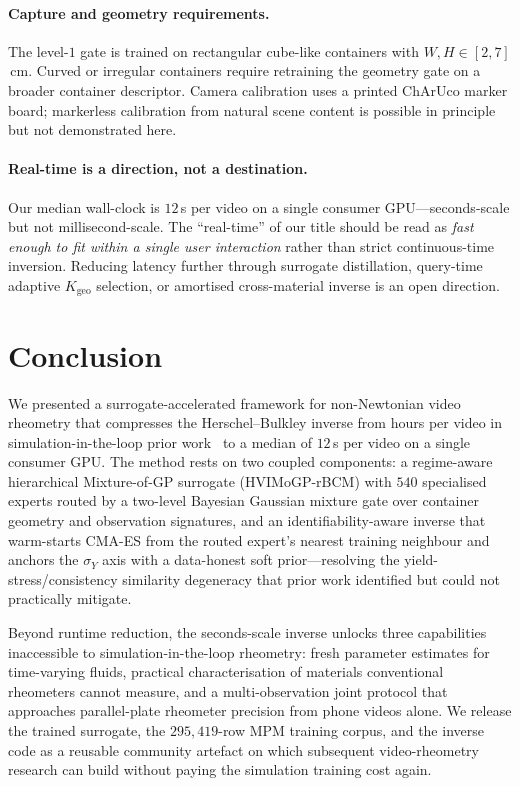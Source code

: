 \paragraph{Capture and geometry requirements.}
The level-$1$ gate is trained on rectangular cube-like containers
with $W, H \in [2, 7]$\,cm. Curved or irregular containers require
retraining the geometry gate on a broader container descriptor.
Camera calibration uses a printed ChArUco marker board; markerless
calibration from natural scene content is possible in principle but
not demonstrated here.

\paragraph{Real-time is a direction, not a destination.}
Our median wall-clock is $12$\,s per video on a single consumer
GPU---seconds-scale but not millisecond-scale. The ``real-time'' of
our title should be read as \emph{fast enough to fit within a single
user interaction} rather than strict continuous-time inversion.
Reducing latency further through surrogate distillation, query-time
adaptive $K_{\mathrm{geo}}$ selection, or amortised cross-material
inverse is an open direction.


\section{Conclusion}

We presented a surrogate-accelerated framework for non-Newtonian
video rheometry that compresses the Herschel--Bulkley inverse from
hours per video in simulation-in-the-loop prior
work~\cite{hamamichi2023nonnewtonian} to a median of $12$\,s per
video on a single consumer GPU. The method rests on two coupled
components: a regime-aware hierarchical Mixture-of-GP surrogate
(HVIMoGP-rBCM) with $540$ specialised experts routed by a two-level
Bayesian Gaussian mixture gate over container geometry and
observation signatures, and an identifiability-aware inverse that
warm-starts CMA-ES from the routed expert's nearest training
neighbour and anchors the $\sigma_Y$ axis with a data-honest soft
prior---resolving the yield-stress/consistency similarity degeneracy
that prior work identified but could not practically mitigate.

Beyond runtime reduction, the seconds-scale inverse unlocks three
capabilities inaccessible to simulation-in-the-loop rheometry: fresh
parameter estimates for time-varying fluids, practical
characterisation of materials conventional rheometers cannot
measure, and a multi-observation joint protocol that approaches
parallel-plate rheometer precision from phone videos alone. We
release the trained surrogate, the $295{,}419$-row MPM training
corpus, and the inverse code as a reusable community artefact on
which subsequent video-rheometry research can build without paying
the simulation training cost again.

